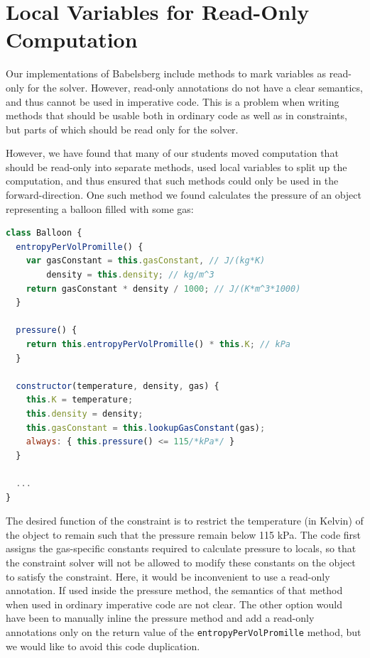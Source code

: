\section{Local Variables for Read-Only Computation}
\label{sec:using-local-vari}
Our implementations of Babelsberg include methods to mark variables as read-only
for the solver. However, read-only annotations do not have a clear semantics,
and thus cannot be used in imperative code. This is a problem when writing
methods that should be usable both in ordinary code as well as in constraints,
but parts of which should be read only for the solver.

However, we have found that many of our students moved computation that should
be read-only into separate methods, used local variables to split up the
computation, and thus ensured that such methods could only be used in the
forward-direction. One such method we found calculates the pressure of an object
representing a balloon filled with some gas:
\begin{lstlisting}[language=JavaScript]
class Balloon {
  entropyPerVolPromille() {
    var gasConstant = this.gasConstant, // J/(kg*K)
        density = this.density; // kg/m^3
    return gasConstant * density / 1000; // J/(K*m^3*1000)
  }

  pressure() {
    return this.entropyPerVolPromille() * this.K; // kPa
  }

  constructor(temperature, density, gas) {
    this.K = temperature;
    this.density = density;
    this.gasConstant = this.lookupGasConstant(gas);
    always: { this.pressure() <= 115/*kPa*/ }
  }

  ...
}
\end{lstlisting}
The desired function of the constraint is to restrict the temperature (in
Kelvin) of the object to remain such that the pressure remain below 115 kPa. The
code first assigns the gas-specific constants required to calculate pressure to
locals, so that the constraint solver will not be allowed to modify these
constants on the object to satisfy the constraint. Here, it would be
inconvenient to use a read-only annotation. If used inside the pressure method,
the semantics of that method when used in ordinary imperative code are not
clear. The other option would have been to manually inline the pressure method
and add a read-only annotations only on the return value of the
\lstinline{entropyPerVolPromille} method, but we would like to avoid this code
duplication.

\SummarySep

